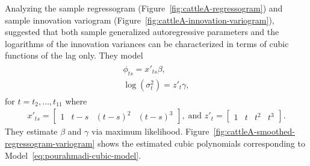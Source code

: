 %
%

Analyzing the sample regressogram (Figure~\ref{fig:cattleA-regressogram}) and sample innovation variogram (Figure~\ref{fig:cattleA-innovation-variogram}), \cite{pourahmadi1999joint} suggested that both sample generalized autoregressive parameters and the logarithms of the innovation variances can be characterized in terms of cubic functions of the lag only. They model 
\begin{align}
\begin{split} \label{eq:pourahmadi-cubic-model}
\phi_{ts} = x'_{ts}\beta, \\
\log\left(\sigma_t^2\right) = z'_{t}\gamma, 
\end{split}
\end{align}
\noindent
for $t = t_2,\dots, t_{11}$ where 
\begin{align*}
x'_{ts} = \begin{bmatrix} 1 & t - s& \left(t - s\right)^2 & \left(t - s\right)^3 \end{bmatrix},\; \mbox{and } z'_{t} = \begin{bmatrix} 1 & t& t^2& t^3 \end{bmatrix}.
\end{align*}
\noindent
They estimate $\beta$ and $\gamma$ via maximum likelihood.  Figure~\ref{fig:cattleA-smoothed-regressogram-variogram} shows the estimated cubic polynomials corresponding to Model~\eqref{eq:pourahmadi-cubic-model}. 

